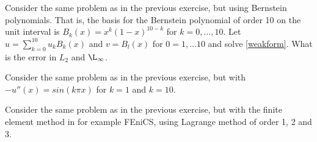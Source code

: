 \begin{exercise}
Consider the same problem as in the previous exercise, but using Bernstein polynomials. 
That is, the basis for the Bernstein polynomial of order 10 on the unit interval is $B_k(x)=x^k(1-x)^{10-k}$ for $k=0, \ldots, 10$.  
Let $u=\sum_{k=0}^{10} u_k B_k(x )$ and $v=B_l(x)$ for $0=1, \ldots 10$
and solve \eqref{weakform}. What is the error in $L_2$ and $\L_\infty$.  
\end{exercise}

\begin{exercise}
Consider the same problem as in the previous exercise, but with  
$-u''(x) = sin(k \pi x)$ for $k=1$ and $k=10$.  
\end{exercise}

\begin{exercise}
Consider the same problem as in the previous exercise, but
with the finite element method in for example FEniCS, using Lagrange 
method of order 1, 2 and 3. 

\end{exercise}











